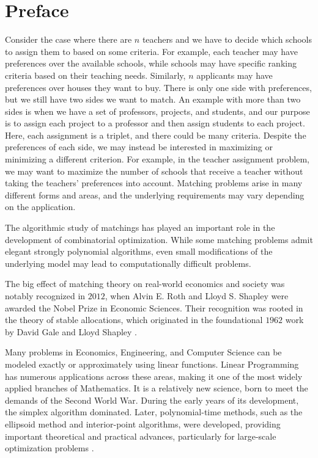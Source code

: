 \documentclass[12pt]{report}
\numberwithin{algorithm}{chapter}
\begin{document}


\chapter*{Preface}
	
	Consider the case where there are $n$ teachers and we have to decide which schools to assign them to based on some criteria. For example, each teacher may have preferences over the available schools, while schools may have specific ranking criteria based on their teaching needs. Similarly, $n$ applicants may have preferences over houses they want to buy. There is only one side with preferences, but we still have two sides we want to match. An example with more than two sides is when we have a set of professors, projects, and students, and our purpose is to assign each project to a professor and then assign students to each project. Here, each assignment is a triplet, and there could be many criteria. Despite the preferences of each side, we may instead be interested in maximizing or minimizing a different criterion. For example, in the teacher assignment problem, we may want to maximize the number of schools that receive a teacher without taking the teachers' preferences into account. Matching problems arise in many different forms and areas, and the underlying requirements may vary depending on the application.
	
	The algorithmic study of matchings has played an important role in the development of combinatorial optimization. While some matching problems admit elegant strongly polynomial algorithms, even small modifications of the underlying model may lead to computationally difficult problems.
	
	The big effect of matching theory on real-world economics and society was notably recognized in $2012$, when Alvin E. Roth and Lloyd S. Shapley were awarded the Nobel Prize in Economic Sciences. Their recognition was rooted in the theory of stable allocations, which originated in the foundational $1962$ work by David Gale and Lloyd Shapley \cite{Gale01011962}.
	
	Many problems in Economics, Engineering, and Computer Science can be modeled exactly or approximately using linear functions. Linear Programming has numerous applications across these areas, making it one of the most widely applied branches of Mathematics. It is a relatively new science, born to meet the demands of the Second World War. During the early years of its development, the simplex algorithm dominated. Later, polynomial-time methods, such as the ellipsoid method and interior-point algorithms, were developed, providing important theoretical and practical advances, particularly for large-scale optimization problems \cite{schrijver2003volA}.
	
\end{document}
